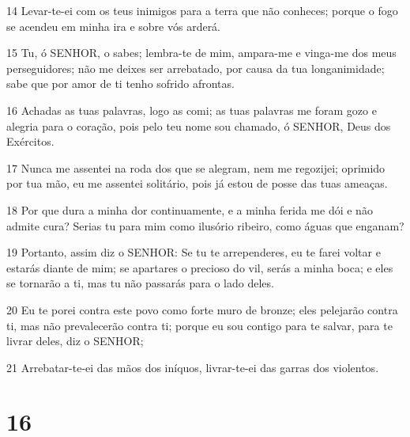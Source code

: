 \par 14 Levar-te-ei com os teus inimigos para a terra que não conheces; porque o fogo se acendeu em minha ira e sobre vós arderá.
\par 15 Tu, ó SENHOR, o sabes; lembra-te de mim, ampara-me e vinga-me dos meus perseguidores; não me deixes ser arrebatado, por causa da tua longanimidade; sabe que por amor de ti tenho sofrido afrontas.
\par 16 Achadas as tuas palavras, logo as comi; as tuas palavras me foram gozo e alegria para o coração, pois pelo teu nome sou chamado, ó SENHOR, Deus dos Exércitos.
\par 17 Nunca me assentei na roda dos que se alegram, nem me regozijei; oprimido por tua mão, eu me assentei solitário, pois já estou de posse das tuas ameaças.
\par 18 Por que dura a minha dor continuamente, e a minha ferida me dói e não admite cura? Serias tu para mim como ilusório ribeiro, como águas que enganam?
\par 19 Portanto, assim diz o SENHOR: Se tu te arrependeres, eu te farei voltar e estarás diante de mim; se apartares o precioso do vil, serás a minha boca; e eles se tornarão a ti, mas tu não passarás para o lado deles.
\par 20 Eu te porei contra este povo como forte muro de bronze; eles pelejarão contra ti, mas não prevalecerão contra ti; porque eu sou contigo para te salvar, para te livrar deles, diz o SENHOR;
\par 21 Arrebatar-te-ei das mãos dos iníquos, livrar-te-ei das garras dos violentos.

\chapter{16}

